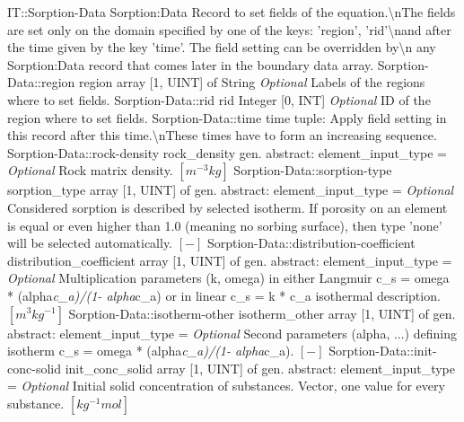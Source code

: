 \begin{RecordType}
	{IT::Sorption-Data}
	{Sorption:Data}
	{}%
	{}%
	{{{Record to set fields of the equation.{\textbackslash}nThe fields are set only on the domain specified by one of the keys: 'region', 'rid'{\textbackslash}nand after the time given by the key 'time'. The field setting can be overridden by{\textbackslash}n any Sorption:Data record that comes later in the boundary data array.}%
}}
		\RecKey
			{Sorption-Data::region}
			{region}
			{{array [1, UINT] of }{String}}{}
			{ \it{Optional}}
			{{{Labels of the regions where to set fields. }%
}}
		\RecKey
			{Sorption-Data::rid}
			{rid}
			{{Integer [0, INT]}}{}
			{ \it{Optional}}
			{{{ID of the region where to set fields.}%
}}
		\RecKey
			{Sorption-Data::time}
			{time}
			{{tuple: }}{}
			{ }
			{{{Apply field setting in this record after this time.{\textbackslash}nThese times have to form an increasing sequence.}%
}}
		\RecKey
			{Sorption-Data::rock-density}
			{rock{\_}density}
			{{gen. abstract: }}{{element{\_}input{\_}type}{ = }}
			{ \it{Optional}}
			{{{Rock matrix density. }{$[m^{-3}kg]$}%
}}
		\RecKey
			{Sorption-Data::sorption-type}
			{sorption{\_}type}
			{{array [1, UINT] of }{gen. abstract: }}{{element{\_}input{\_}type}{ = }}
			{ \it{Optional}}
			{{{Considered sorption is described by selected isotherm.
If porosity on an element is equal or even higher than 1.0 (meaning no sorbing surface), then type 'none' will be selected automatically. }{$[-]$}%
}}
		\RecKey
			{Sorption-Data::distribution-coefficient}
			{distribution{\_}coefficient}
			{{array [1, UINT] of }{gen. abstract: }}{{element{\_}input{\_}type}{ = }}
			{ \it{Optional}}
			{{{Multiplication parameters (k, omega) in either Langmuir c{\_}s = omega * (alpha}\textit{c{\_}a)/(1- alpha}{c{\_}a) or in linear c{\_}s = k * c{\_}a isothermal description. }{$[m^{3}kg^{-1}]$}%
}}
		\RecKey
			{Sorption-Data::isotherm-other}
			{isotherm{\_}other}
			{{array [1, UINT] of }{gen. abstract: }}{{element{\_}input{\_}type}{ = }}
			{ \it{Optional}}
			{{{Second parameters (alpha, ...) defining isotherm  c{\_}s = omega * (alpha}\textit{c{\_}a)/(1- alpha}{c{\_}a). }{$[-]$}%
}}
		\RecKey
			{Sorption-Data::init-conc-solid}
			{init{\_}conc{\_}solid}
			{{array [1, UINT] of }{gen. abstract: }}{{element{\_}input{\_}type}{ = }}
			{ \it{Optional}}
			{{{Initial solid concentration of substances.
Vector, one value for every substance. }{$[kg^{-1}mol]$}%
}}
\end{RecordType}
